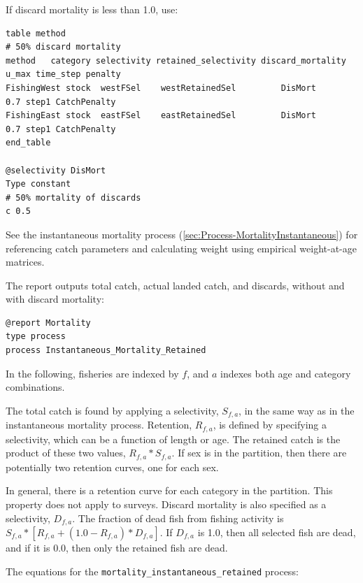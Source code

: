 If discard mortality is less than 1.0, use:

{\small{\begin{verbatim}
table method
# 50% discard mortality
method   category selectivity retained_selectivity discard_mortality u_max time_step penalty
FishingWest stock  westFSel    westRetainedSel         DisMort        0.7 step1 CatchPenalty
FishingEast stock  eastFSel    eastRetainedSel         DisMort        0.7 step1 CatchPenalty
end_table

@selectivity DisMort
Type constant
# 50% mortality of discards
c 0.5
\end{verbatim}}}

See the instantaneous mortality process (\ref{sec:Process-MortalityInstantaneous}) for referencing catch parameters and calculating weight using empirical weight-at-age matrices.

The report outputs total catch, actual landed catch, and discards, without and with discard mortality:

{\small{\begin{verbatim}
@report Mortality
type process
process Instantaneous_Mortality_Retained
\end{verbatim}}}


In the following, fisheries are indexed by $f$, and $a$ indexes both age and category combinations.

The total catch is found by applying a selectivity, $S_{f,a}$, in the same way as in the instantaneous mortality process. Retention, $R_{f,a}$, is defined by specifying a selectivity, which can be a function of length or age. The retained catch is the product of these two values, $R_{f,a} * S_{f,a}$. If sex is in the partition, then there are potentially two retention curves, one for each sex.

In general, there is a retention curve for each category in the partition. This property does not apply to surveys. Discard mortality is also specified as a selectivity, $D_{f,a}$. The fraction of dead fish from fishing activity is $S_{f,a} * [ R_{f,a} + (1.0 - R_{f,a}) * D_{f,a} ]$. If $D_{f,a}$ is 1.0, then all selected fish are dead, and if it is 0.0, then only the retained fish are dead.

The equations for the \texttt{mortality\_instantaneous\_retained} process:

